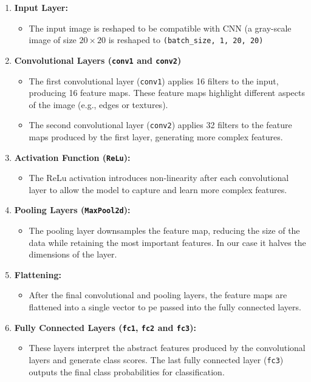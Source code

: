 \documentclass{article}
\begin{document}
\begin{enumerate}
    \item \textbf{Input Layer:}
    \begin{itemize}
        \item The input image is reshaped to be compatible with CNN (a gray-scale image of size $20 \times 20$ is reshaped to \texttt{({batch\_size}, 1, 20, 20)}
    \end{itemize}
    
    \item \textbf{Convolutional Layers (\texttt{conv1} and \texttt{conv2})}
    \begin{itemize}
        \item The first convolutional layer (\texttt{conv1}) applies 16 filters to the input, producing 16 feature maps. These feature maps highlight different aspects of the image (e.g., edges or textures).
        \item The second convolutional layer (\texttt{conv2}) applies 32 filters to the feature maps produced by the first layer, generating more complex features.
    \end{itemize}
    
    \item \textbf{Activation Function (\texttt{ReLu}):}
    \begin{itemize}
        \item The ReLu activation introduces non-linearity after each convolutional layer to allow the model to capture and learn more complex features.
    \end{itemize}

    \item \textbf{Pooling Layers (\texttt{MaxPool2d}):}
    \begin{itemize}
        \item The pooling layer downsamples the feature map, reducing the size of the data while retaining the most important features. In our case it halves the dimensions of the layer.
    \end{itemize}
    
    \item \textbf{Flattening:}
    \begin{itemize}
        \item After the final convolutional and pooling layers, the feature maps are flattened into a single vector to pe passed into the fully connected layers.
    \end{itemize}
    
    \item \textbf{Fully Connected Layers (\texttt{fc1}, \texttt{fc2} and \texttt{fc3}):}
    \begin{itemize}
        \item These layers interpret the abstract features produced by the convolutional layers and generate class scores. The last fully connected layer (\texttt{fc3}) outputs the final class probabilities for classification.
    \end{itemize}
    

\end{enumerate}
\end{document}

